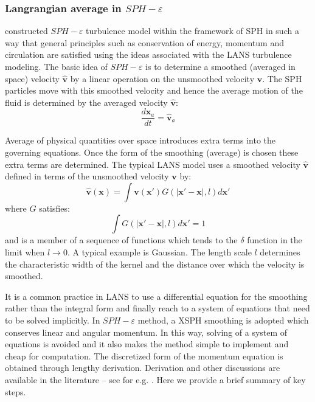 \documentclass[gmd, manuscript]{copernicus}
\begin{document}
\subsubsection{Langrangian average in $SPH-\varepsilon$}
\citet{monaghan2011turbulence} constructed $SPH-\varepsilon$ turbulence model within the framework of SPH in such a way that general principles such as conservation of energy, momentum and circulation are satisfied using the ideas associated with the LANS turbulence modeling. The basic idea of $SPH-\varepsilon$ is to determine a smoothed (averaged in space) velocity $\widehat{\textbf{v}}$ by a linear operation on the unsmoothed velocity $\textbf{v}$. The SPH particles move with this smoothed velocity and hence the average motion of the fluid is determined by the averaged velocity $\widehat{\textbf{v}}$:
\begin{equation}
\dfrac{d \textbf{x}_a}{dt} = \widehat{\textbf{v}}_a \label{eq:gov-update-pos-turbulence}
\end{equation}

Average of physical quantities over space introduces extra terms into the governing equations. Once the form of the smoothing (average) is chosen these extra terms are determined.
The typical LANS model uses a smoothed velocity $\widehat{\textbf{v}}$ 
defined in terms of the unsmoothed velocity $\textbf{v}$ by:
\begin{equation}
\widehat{\textbf{v}}\left(\textbf{x}\right)=\int \textbf{v}\left(\textbf{x} \prime\right)G\left(\vert \textbf{x} \prime - \textbf{x} \vert, l\right) d\textbf{x} \prime
\end{equation}
where $G$ satisfies:
\begin{equation}
\int G\left(\vert \textbf{x} \prime - \textbf{x} \vert, l\right) d\textbf{x} \prime =1
\end{equation}
and is a member of a sequence of functions which tends to the $\delta$ function in the limit when $ l\rightarrow 0$. A typical example is Gaussian.
The length scale $l$ determines the characteristic width of the kernel and the distance over which the velocity is smoothed.

It is a common practice in LANS to use a differential equation for the smoothing rather than the integral form and finally reach to a system of equations that need to be solved implicitly. In $SPH-\varepsilon$ method, a XSPH \citep{monaghan1989problem} smoothing is adopted which conserves linear and angular momentum. In this way, solving of a system of equations is avoided and it also makes the method simple to implement and cheap for computation. 
The discretized form of the momentum equation is obtained through lengthy derivation. Derivation and other discussions are available in the literature -- see for e.g. \citep{monaghan2011turbulence}. Here we provide a brief summary of key steps.
\end{document}
